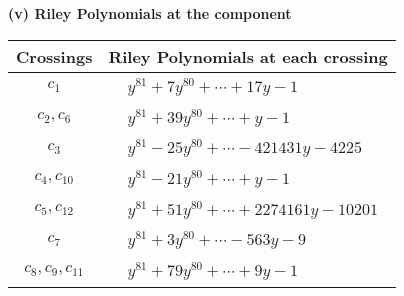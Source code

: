 \documentclass[1p]{elsarticle_modified}
\theoremstyle{definition}
\begin{document}
\newpage\renewcommand{\arraystretch}{1}
\flushleft \textbf{(v) Riley Polynomials at the component}\newline \\
\begin{tabular}{m{50pt}|m{274pt}}
Crossings & \hspace{64pt}Riley Polynomials at each crossing \\
\hline $$\begin{aligned}c_{1}\end{aligned}$$&$\begin{aligned}
&y^{81}+7 y^{80}+\cdots+17 y-1
\end{aligned}$\\
\hline $$\begin{aligned}c_{2},c_{6}\end{aligned}$$&$\begin{aligned}
&y^{81}+39 y^{80}+\cdots+y-1
\end{aligned}$\\
\hline $$\begin{aligned}c_{3}\end{aligned}$$&$\begin{aligned}
&y^{81}-25 y^{80}+\cdots-421431 y-4225
\end{aligned}$\\
\hline $$\begin{aligned}c_{4},c_{10}\end{aligned}$$&$\begin{aligned}
&y^{81}-21 y^{80}+\cdots+y-1
\end{aligned}$\\
\hline $$\begin{aligned}c_{5},c_{12}\end{aligned}$$&$\begin{aligned}
&y^{81}+51 y^{80}+\cdots+2274161 y-10201
\end{aligned}$\\
\hline $$\begin{aligned}c_{7}\end{aligned}$$&$\begin{aligned}
&y^{81}+3 y^{80}+\cdots-563 y-9
\end{aligned}$\\
\hline $$\begin{aligned}c_{8},c_{9},c_{11}\end{aligned}$$&$\begin{aligned}
&y^{81}+79 y^{80}+\cdots+9 y-1
\end{aligned}$\\
\hline
\end{tabular}\\~\\
\end{document}
